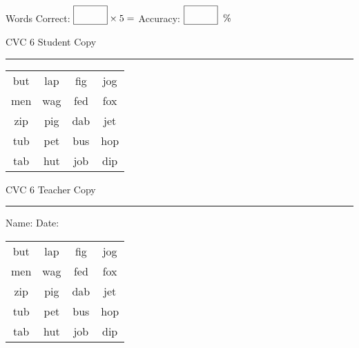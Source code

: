\documentclass{memoir}
\begin{document}
\normalsize

Words Correct: $\fbox{\phantom{\huge 100}} \times 5 = $ Accuracy: $\fbox{\phantom{\huge 100}}\;\; \%$ 

\vfill

\newpage


\footnotesize \noindent
CVC 6 \hfill Student Copy
\smallskip
\hrule

\huge

\setlength{\tabcolsep}{14pt}
\def\arraystretch{2}

{\selectfont


\begin{vplace}[0.5]
\begin{center}
\begin{tabular}{cccc}
but & lap & fig & jog \\
men & wag & fed & fox \\
zip & pig & dab & jet \\
tub & pet & bus & hop \\
tab & hut & job & dip \\
\end{tabular}
\end{center}
\end{vplace}

}

\newpage

\footnotesize \noindent
CVC 6 \hfill Teacher Copy
\smallskip
\hrule

\normalsize

\vfill

\noindent
Name: \underline{\hspace{1.75in}} \hfill Date: \underline{\hspace{1in}}

\huge

{\selectfont


\begin{vplace}[0.5]
\begin{center}
\begin{tabular}{cccc}
but & lap & fig & jog \\
men & wag & fed & fox \\
zip & pig & dab & jet \\
tub & pet & bus & hop \\
tab & hut & job & dip \\
\end{tabular}
\end{center}
\end{vplace}



}
\end{document}
